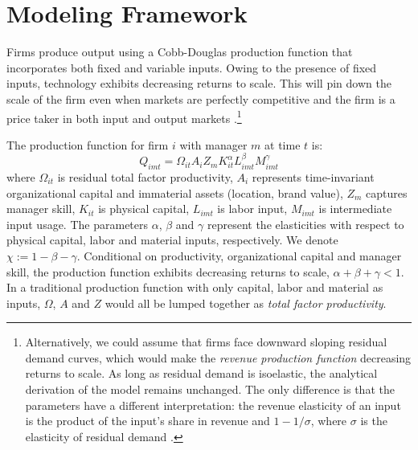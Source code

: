 \section{Modeling Framework}
Firms produce output using a Cobb-Douglas production function that incorporates both fixed and variable inputs. Owing to the presence of fixed inputs, technology exhibits decreasing returns to scale. This will pin down the scale of the firm even when markets are perfectly competitive and the firm is a price taker in both input and output markets \citep{AtkesonKehoe2005JPE,McGrattan2012RED}.\footnote{Alternatively, we could assume that firms face downward sloping residual demand curves, which would make the \emph{revenue production function} decreasing returns to scale. As long as residual demand is isoelastic, the analytical derivation of the model remains unchanged. The only difference is that the parameters have a different interpretation: the revenue elasticity of an input is the product of the input's share in revenue and $1-1/\sigma$, where $\sigma$ is the elasticity of residual demand \citep{DeLoecker2011Econometrica}.}

The production function for firm $i$ with manager $m$ at time $t$ is:
\begin{equation}\label{eq:production}
Q_{imt} = \Omega_{it}A_i Z_{m}  K_{it}^\alpha L_{imt}^{\beta} M_{imt}^{\gamma}
\end{equation}
where $\Omega_{it}$ is residual total factor productivity, $A_i$ represents time-invariant organizational capital and immaterial assets (location, brand value), $Z_m$ captures manager skill, $K_{it}$ is physical capital, $L_{imt}$ is labor input, $M_{imt}$ is intermediate input usage. The parameters $\alpha$, $\beta$ and $\gamma$ represent the elasticities with respect to physical capital, labor and material inputs, respectively. We denote $\chi := 1 - \beta - \gamma$. Conditional on productivity, organizational capital and manager skill, the production function exhibits decreasing returns to scale, $\alpha + \beta + \gamma < 1$. In a traditional production function with only capital, labor and material as inputs, $\Omega$, $A$ and $Z$ would all be lumped together as \emph{total factor productivity}.

